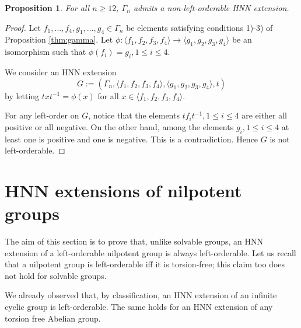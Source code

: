 \documentclass[12pt]{amsart}
\newtheorem{prop}[thm]{Proposition}
\theoremstyle{definition}
\begin{document}
  \medskip
 
  \begin{prop} \label{thm:solvable} For all $n\geq 12$, $\Gamma _n$ admits a non-left-orderable HNN extension. 
  \end{prop}
  
  \begin{proof} Let $f_1, \dots, f_4, g_1, \dots , g_4\in \Gamma _n$ be elements satisfying conditions 1)-3) of Proposition \ref{thm:gamma}. Let $\phi :\langle f_1, f_2, f_3, f_4\rangle \to \langle g_1, g_2, g_3, g_4\rangle$ be an isomorphism such that $\phi (f_i) = g_i, 1\leq i\leq 4$. 
  
  We consider an HNN extension $$G:= (\Gamma _n, \langle f_1, f_2, f_3, f_4\rangle, \langle g_1, g_2, g_3, g_4\rangle, t )$$ by letting $txt^{-1} = \phi (x)$ for all $x\in  \langle f_1, f_2, f_3, f_4\rangle$. 
  
  For any left-order on $G$, notice that the elements $tf_it^{-1}, 1\leq i\leq 4$ are either all positive or all negative. On the other hand, among the elements $g_i, 1\leq i\leq 4$ at least one is positive and one is negative. This is a contradiction. Hence $G$ is not left-orderable. \end{proof}
  
      
 
 
 
  
 \section{HNN extensions of nilpotent groups}
 
 The aim of this section is to prove that, unlike solvable groups, an HNN extension of a left-orderable nilpotent group is always left-orderable. Let us recall that a nilpotent group is left-orderable iff it is torsion-free; this claim too does not hold for solvable groups. 
 
 \medskip

  We already observed that, by classification, an HNN extension of an infinite cyclic group is left-orderable. The same holds for an HNN extension of any torsion free Abelian group.

  \medskip 
  
\end{document}
